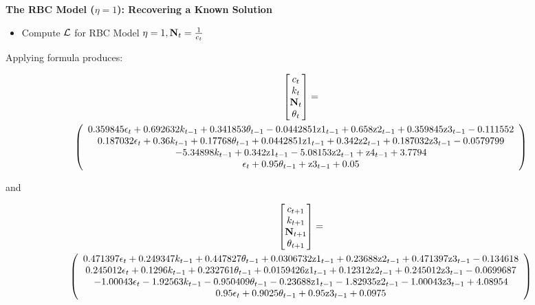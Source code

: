 \documentclass[12pt]{article}
\begin{document}
  {\bf The RBC Model ($\eta=1$): Recovering a Known Solution}

  \begin{itemize}
  \item Compute ${\mathcal{L}}$ for RBC Model $\eta=1,{\mathbf{N}}_t=\frac{1}{c_t}$
  \end{itemize}

Applying formula  produces:

{\tiny
\begin{gather}
  \begin{bmatrix}
c_t\\k_t\\ \rcpC_t\\\theta_t
  \end{bmatrix}=\\%
   \left(
   \begin{array}{c}
 0.359845 \epsilon _t+0.692632 k_{t-1}+0.341853 \theta _{t-1}-0.0442851
   \text{z1}_{t-1}+0.658 \text{z2}_{t-1}+0.359845 \text{z3}_{t-1}-0.111552 \\
 0.187032 \epsilon _t+0.36 k_{t-1}+0.17768 \theta _{t-1}+0.0442851
   \text{z1}_{t-1}+0.342 \text{z2}_{t-1}+0.187032 \text{z3}_{t-1}-0.0579799 \\
 -5.34898 k_{t-1}+0.342 \text{z1}_{t-1}-5.08153
   \text{z2}_{t-1}+\text{z4}_{t-1}+3.7794 \\
 \epsilon _t+0.95 \theta _{t-1}+\text{z3}_{t-1}+0.05 \\
   \end{array}
   \right)
\end{gather}
}

and 


{\tiny
\begin{gather}
  \begin{bmatrix}
c_{t+1}\\k_{t+1}\\ \rcpC_{t+1}\\\theta_{t+1}
  \end{bmatrix}=\\%
  \left(
   \begin{array}{c}
 0.471397 \epsilon _t+0.249347 k_{t-1}+0.447827 \theta _{t-1}+0.0306732
   \text{z1}_{t-1}+0.23688 \text{z2}_{t-1}+0.471397 \text{z3}_{t-1}-0.134618 \\
 0.245012 \epsilon_t+0.1296 k_{t-1}+0.232761 \theta _{t-1}+0.0159426
   \text{z1}_{t-1}+0.12312 \text{z2}_{t-1}+0.245012 \text{z3}_{t-1}-0.0699687 \\
 -1.00043 \epsilon _t-1.92563 k_{t-1}-0.950409 \theta _{t-1}-0.23688
   \text{z1}_{t-1}-1.82935 \text{z2}_{t-1}-1.00043 \text{z3}_{t-1}+4.08954 \\
 0.95 \epsilon _t+0.9025 \theta _{t-1}+0.95 \text{z3}_{t-1}+0.0975 \\
   \end{array}
   \right)
\end{gather}}
\end{document}
